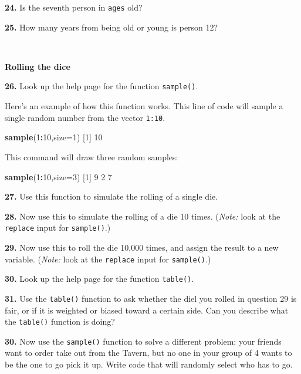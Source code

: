 \documentclass[
]{book}
\newenvironment{Shaded}{\begin{snugshade}}{\end{snugshade}}
\newcommand{\AttributeTok}[1]{\textcolor[rgb]{0.13,0.29,0.53}{#1}}
\newcommand{\DecValTok}[1]{\textcolor[rgb]{0.00,0.00,0.81}{#1}}
\newcommand{\FunctionTok}[1]{\textcolor[rgb]{0.13,0.29,0.53}{\textbf{#1}}}
\newcommand{\NormalTok}[1]{#1}
\newcommand{\SpecialCharTok}[1]{\textcolor[rgb]{0.81,0.36,0.00}{\textbf{#1}}}
\begin{document}
\textbf{24.} Is the seventh person in \texttt{ages} old?

\textbf{25.} How many years from being old or young is person 12?

~

\textbf{Rolling the dice}

\textbf{26.} Look up the help page for the function \texttt{sample()}.

Here's an example of how this function works. This line of code will sample a single random number from the vector \texttt{1:10}.

\begin{Shaded}
\begin{Highlighting}[]
\FunctionTok{sample}\NormalTok{(}\DecValTok{1}\SpecialCharTok{:}\DecValTok{10}\NormalTok{,}\AttributeTok{size=}\DecValTok{1}\NormalTok{)}
\NormalTok{[}\DecValTok{1}\NormalTok{] }\DecValTok{10}
\end{Highlighting}
\end{Shaded}

This command will draw three random samples:

\begin{Shaded}
\begin{Highlighting}[]
\FunctionTok{sample}\NormalTok{(}\DecValTok{1}\SpecialCharTok{:}\DecValTok{10}\NormalTok{,}\AttributeTok{size=}\DecValTok{3}\NormalTok{)}
\NormalTok{[}\DecValTok{1}\NormalTok{] }\DecValTok{9} \DecValTok{2} \DecValTok{7}
\end{Highlighting}
\end{Shaded}

\textbf{27.} Use this function to simulate the rolling of a single die.

\textbf{28.} Now use this to simulate the rolling of a die 10 times. (\emph{Note:} look at the \texttt{replace} input for \texttt{sample()}.)

\textbf{29.} Now use this to roll the die 10,000 times, and assign the result to a new variable. (\emph{Note:} look at the \texttt{replace} input for \texttt{sample()}.)

\textbf{30.} Look up the help page for the function \texttt{table()}.

\textbf{31.} Use the \texttt{table()} function to ask whether the diel you rolled in question 29 is fair, or if it is weighted or biased toward a certain side. Can you describe what the \texttt{table()} function is doing?

\textbf{30.} Now use the \texttt{sample()} function to solve a different problem: your friends want to order take out from the Tavern, but no one in your group of 4 wants to be the one to go pick it up. Write code that will randomly select who has to go.
\end{document}
